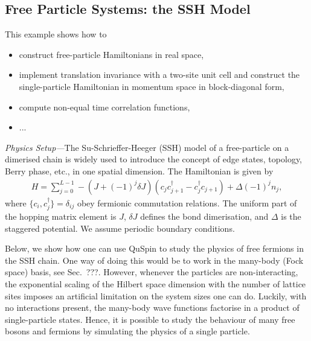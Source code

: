 \documentclass{SciPost}
\newcommand\0{\scalebox{-1}[1]{0}}
\begin{document}
\subsection{Free Particle Systems: the SSH Model}

\label{subsec:SSH_model}

This example shows how to
\begin{itemize}
	\item construct free-particle Hamiltonians in real space,
	\item implement translation invariance with a two-site unit cell and construct the single-particle Hamiltonian in momentum space in block-diagonal form,
	\item compute non-equal time correlation functions,
	\item ...
\end{itemize}

\noindent\emph{Physics Setup---}The Su-Schrieffer-Heeger (SSH) model of a free-particle on a dimerised chain is widely used to introduce the concept of edge states, topology, Berry phase, etc., in one spatial dimension. The Hamiltonian is given by
\begin{eqnarray}
H = \sum_{j=0}^{L-1} -(J+(-1)^j\delta J)\left(c_jc^\dagger_{j+1} - c^\dagger_{j}c_{j+1}\right) + \Delta(-1)^jn_j, 
\label{eq:SSH}
\end{eqnarray}
where $\{c_i,c^\dagger_j\}=\delta _{ij}$ obey fermionic commutation relations. The uniform part of the hopping matrix element is $J$, $\delta J$ defines the bond dimerisation, and $\Delta$ is the staggered potential. We assume periodic boundary conditions.

Below, we show how one can use QuSpin to study the physics of free fermions in the SSH chain. One way of doing this would be to work in the many-body (Fock space) basis, see Sec.~???. However, whenever the particles are non-interacting, the exponential scaling of the Hilbert space dimension with the number of lattice sites imposes an artificial limitation on the system sizes one can do. Luckily, with no interactions present, the many-body wave functions factorise in a product of single-particle states. Hence, it is possible to study the behaviour of many free bosons and fermions by simulating the physics of a single particle.
\end{document}
